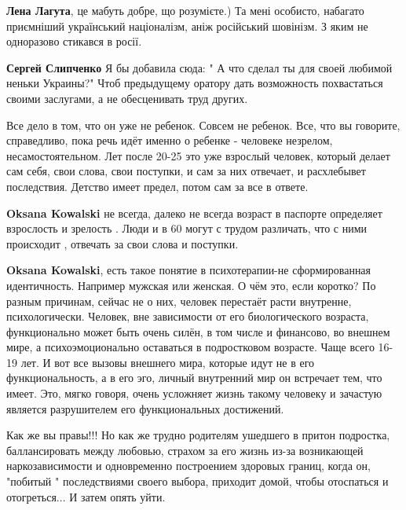\begin{itemize}
\begin{itemize}
\textbf{Лена Лагута}, це мабуть добре, що розумієте.)
Та мені особисто, набагато приємніший український націоналізм, аніж російський шовінізм. З яким не одноразово стикався в росії.

\textbf{Сергей Слипченко} Я бы добавила сюда: " А что сделал ты для своей любимой неньки Украины?" Чтоб предыдущему оратору дать возможность похвастаться своими заслугами, а не обесценивать труд других.

\end{itemize} %


Все дело в том, что он уже не ребенок. Совсем не ребенок. Все, что вы говорите,
справедливо, пока речь идёт именно о ребенке - человеке незрелом,
несамостоятельном. Лет после 20-25 это уже взрослый человек, который делает сам
себя, свои слова, свои поступки, и сам за них отвечает, и расхлебывет
последствия. Детство имеет предел, потом сам за все в ответе.

\begin{itemize} %
\textbf{Oksana Kowalski} не всегда, далеко не всегда возраст в паспорте определяет взрослость и зрелость . Люди и в 60 могут с трудом различать, что с ними происходит , отвечать за свои слова и поступки.


\textbf{Oksana Kowalski}, есть такое понятие в психотерапии-не сформированная идентичность. Например мужская или женская.
О чём это, если коротко?
По разным причинам, сейчас не о них, человек перестаёт расти внутренне, психологически.
Человек,
вне зависимости от его биологического возраста, функционально может быть очень силён, в том числе и финансово, во внешнем мире, а психоэмоционально оставаться в подростковом возрасте. Чаще всего 16-19 лет.
И вот все вызовы внешнего мира, которые идут не в его функциональность, а в его эго, личный внутренний мир он встречает тем, что имеет.
Это, мягко говоря, очень усложняет жизнь такому человеку и зачастую является разрушителем его функциональных достижений.
\end{itemize} %


Как же вы правы!!! Но как же трудно родителям ушедшего в притон подростка,
баллансировать между любовью, страхом за его жизнь из-за возникающей
наркозависимости и одновременно построением здоровых границ, когда он, "побитый
" последствиями своего выбора, приходит домой, чтобы отоспаться и отогреться...
И затем опять уйти.


\end{itemize}
